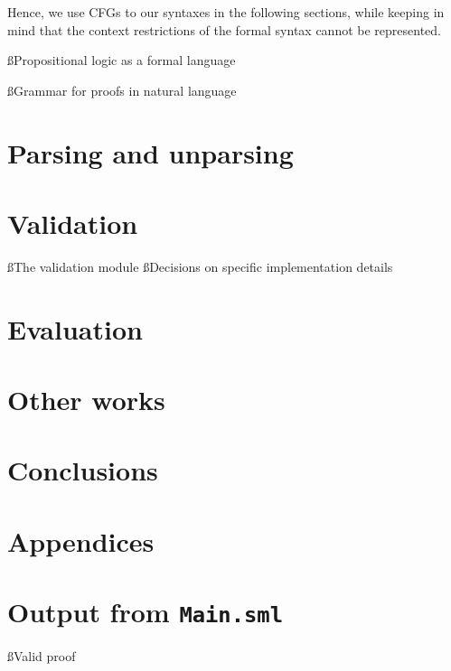 \documentclass[a4paper]{article}
\begin{document}
 Hence, we use CFGs to  our syntaxes in the following sections,
 while keeping in mind that the context restrictions of the formal syntax
 cannot be represented.

\ss{Propositional logic as a formal language}


\ss{Grammar for proofs in natural language}\label{nlgram}


\section{Parsing and unparsing}\label{punp}


\section{Validation}\label{vmod}
\ss{The validation module}
\ss{Decisions on specific implementation details}

\section{Evaluation}


\section{Other works}

\section{Conclusions}


\label{LastBody}
\pagebreak
{}


\label{LastBio}
\clearpage
\appendix
\section*{Appendices}\label{FirstApp}
\renewcommand \thesubsection{\alph{subsection}}
\renewcommand \thesubsubsection{\roman{subsubsection}}

\section{Output from \tt{Main.sml}}\label{output}
\ss{Valid proof}
\end{document}
